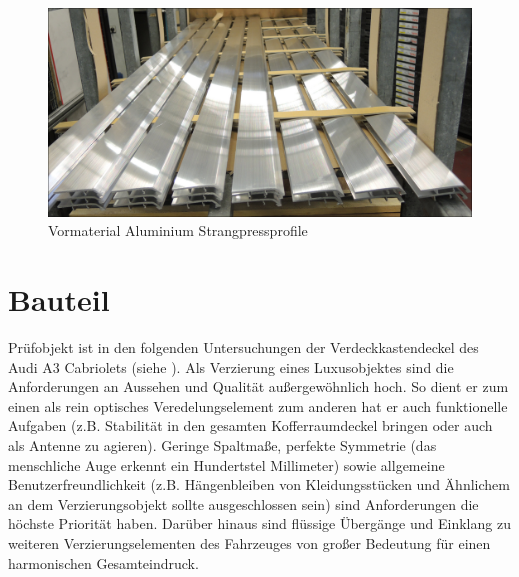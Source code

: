 \documentclass[12pt,a4paper,parskip,twoside,BCOR5mm,headsepline]{scrartcl}
\begin{document}
\begin{figure}[H]
 \centering
 \includegraphics[width=.8\textwidth]{vormaterial}
 \caption{Vormaterial Aluminium Strangpressprofile}
 \label{fig:vormaterial}
 \end{figure}
  







  
\newpage
\section{Bauteil}
Prüfobjekt ist in den folgenden Untersuchungen der Verdeckkastendeckel  des Audi A3 Cabriolets (siehe ).
 Als Verzierung eines Luxusobjektes sind die Anforderungen an Aussehen und Qualität außergewöhnlich hoch. So dient er zum einen als rein optisches Veredelungselement zum anderen hat er auch funktionelle Aufgaben (z.B. Stabilität in den gesamten Kofferraumdeckel bringen oder auch als Antenne zu agieren). Geringe Spaltmaße,  perfekte Symmetrie (das menschliche Auge erkennt ein Hundertstel Millimeter) sowie allgemeine Benutzerfreundlichkeit (z.B. Hängenbleiben von Kleidungsstücken und Ähnlichem an dem Verzierungsobjekt sollte ausgeschlossen sein) sind Anforderungen die höchste Priorität haben.
 Darüber hinaus sind  flüssige Übergänge und Einklang   zu weiteren Verzierungselementen des Fahrzeuges von großer Bedeutung für einen harmonischen Gesamteindruck.
 
\end{document}
